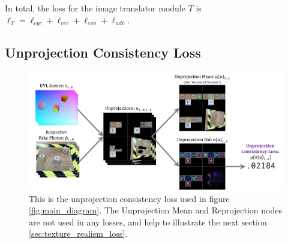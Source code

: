 \documentclass{article}
\begin{document}
In total, the loss for the image translator module $T$ is $\ell_T=\ell_{cyc}+\ell_{rec}+\ell_{con}+\ell_{adv}$.







\subsection{Unprojection Consistency Loss}
\label{sec:unprojection_consistency_loss}

\begin{figure}[H]
	\begin{center}
		\includegraphics[width=400pt]{../images/unprojection_consistency_loss_without_reprojection.pdf}
	\end{center}
	\caption{
		This is the unprojection consistency loss used in figure \ref{fig:main_diagram}.
		The Unprojection Mean and Reprojection nodes are not used in any losses, and help to illustrate the next section \ref{sec:texture_realism_loss}.
	}
	\label{fig:unprojection_consistency_loss}
\end{figure}
\end{document}
